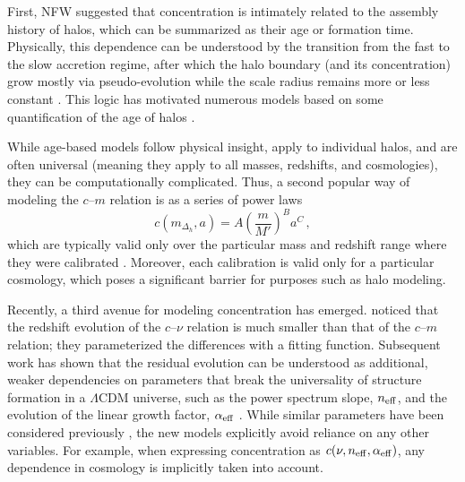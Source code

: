 \documentclass[5p,aas_macros]{elsarticle}
\begin{document}
First, NFW suggested that concentration is intimately related to the assembly history of halos, which can be summarized as their age or formation time. Physically, this dependence can be understood by the transition from the fast to the slow accretion regime, after which the halo boundary (and its concentration) grow mostly via pseudo-evolution while the scale radius remains more or less constant \citep{Navarro1997, Bullock2001, Bosch2002, Wechsler2002, Zhao2003, Dalal2010, Diemer2013, Ludlow2013, Wang2020}. This logic has motivated numerous models based on some quantification of the age of halos \citep[e.g.,][]{Eke2001, Zhao2009, Giocoli2012, Ludlow2014, Ludlow2016, Correa2015b}. 

While age-based models follow physical insight, apply to individual halos, and are often universal (meaning they apply to all masses, redshifts, and cosmologies), they can be computationally complicated. Thus, a second popular way of modeling the $c$--$m$ relation is as a series of power laws 
\begin{equation}
    c(m_{\Delta_h},a) = A\left(\frac{m}{M'}\right)^B a^C \,,
\end{equation}
which are typically valid only over the particular mass and redshift range where they were calibrated \citep[e.g.,][]{Dolag2004, Duffy2008, Maccio2008, Bhattacharya2013, Dutton2014, Klypin2016, Child2018}. Moreover, each calibration is valid only for a particular cosmology, which poses a significant barrier for purposes such as halo modeling.


Recently, a third avenue for modeling concentration has emerged. \citet{Prada2012} noticed that the redshift evolution of the $c$--$\nu$ relation is much smaller than that of the $c$--$m$ relation; they parameterized the differences with a fitting function. Subsequent work has shown that the residual evolution can be understood as additional, weaker dependencies on parameters that break the universality of structure formation in a $\Lambda$CDM universe, such as the power spectrum slope, $n_{\rm eff}$, and the evolution of the linear growth factor, $\alpha_{\rm eff}$ \citep{Diemer2015, Diemer2019, Ishiyama2020}. While similar parameters have been considered previously \citep[e.g.,][]{Bullock2001, Eke2001, Zhao2009}, the new models explicitly avoid reliance on any other variables. For example, when expressing concentration as $c(\nu, n_{\rm eff}, \alpha_{\rm eff})$, any dependence in cosmology is implicitly taken into account.
\end{document}

